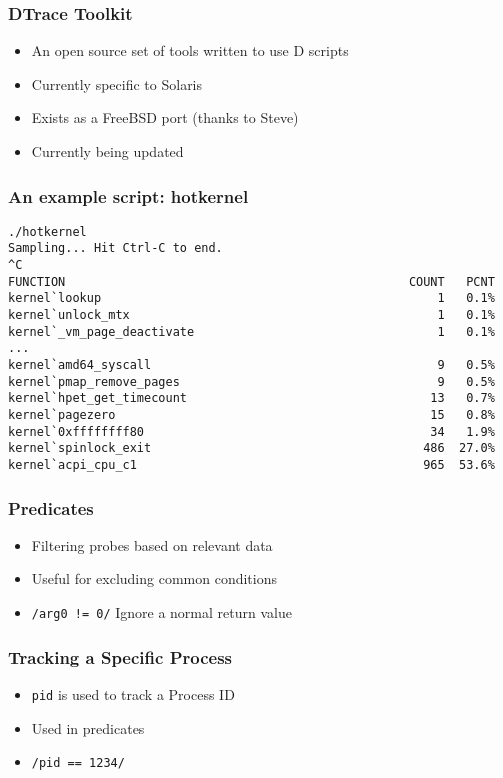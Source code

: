 \documentclass[pdftex]{beamer}
\begin{document}
\begin{frame}
  \frametitle{DTrace Toolkit}
  \begin{itemize}
  \item An open source set of tools written to use D scripts
  \item Currently specific to Solaris
  \item Exists as a FreeBSD port (thanks to Steve)
  \item Currently being updated
  \end{itemize}
\end{frame}

\begin{frame}[fragile]
  \frametitle{An example script: hotkernel}
\begin{lstlisting}
./hotkernel 
Sampling... Hit Ctrl-C to end.
^C
FUNCTION                                                COUNT   PCNT
kernel`lookup                                               1   0.1%
kernel`unlock_mtx                                           1   0.1%
kernel`_vm_page_deactivate                                  1   0.1%
...
kernel`amd64_syscall                                        9   0.5%
kernel`pmap_remove_pages                                    9   0.5%
kernel`hpet_get_timecount                                  13   0.7%
kernel`pagezero                                            15   0.8%
kernel`0xffffffff80                                        34   1.9%
kernel`spinlock_exit                                      486  27.0%
kernel`acpi_cpu_c1                                        965  53.6%
\end{lstlisting}
\end{frame}

\begin{frame}[fragile]
  \frametitle{Predicates}
  \begin{itemize}
  \item Filtering probes based on relevant data
  \item Useful for excluding common conditions
  \item \verb+/arg0 != 0/+  Ignore a normal return value
  \end{itemize}
\end{frame}

\begin{frame}[fragile]
  \frametitle{Tracking a Specific Process}
  \begin{itemize}
  \item \verb+pid+ is used to track a Process ID
  \item Used in predicates
  \item \verb+/pid == 1234/+
\end{itemize}
\end{frame}
\end{document}

